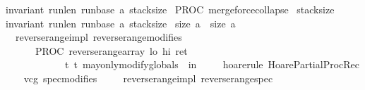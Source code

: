 \begin{isabellebody}
{\isacharparenleft}invariant\ {\isasymacute}run{\isacharunderscore}len\ {\isasymacute}run{\isacharunderscore}base\ {\isasymacute}a\ {\isasymacute}stack{\isacharunderscore}size{\isacharparenright}\ {\isasymrbrace}\isanewline
PROC\ merge{\isacharunderscore}force{\isacharunderscore}collapse{\isacharparenleft}{\isacharparenright}\isanewline
{\isasymlbrace}\ {\isacharparenleft}{\isasymacute}stack{\isacharunderscore}size\ {\isacharequal}\ {}{\isacharparenright}\ {\isasymand}\isanewline
{\isacharparenleft}invariant\ {\isasymacute}run{\isacharunderscore}len\ {\isasymacute}run{\isacharunderscore}base\ {\isasymacute}a\ {\isasymacute}stack{\isacharunderscore}size{\isacharparenright}\ {\isasymand}\isanewline
{\isacharparenleft}size\ {\isasymacute}a\ {\isacharequal}\ size\ \isactrlbsup {\isasymsigma}\isactrlesup a{\isacharparenright}\ {\isasymrbrace}{\isachardoublequoteclose}\isanewline
%
\isadelimproof
\ \ %
\endisadelimproof
%
\isatagproof
{}\isamarkupfalse%
%
\endisatagproof
{\isafoldproof}%
%
\isadelimproof
\isanewline
%
\endisadelimproof
\isanewline
\isanewline
{}\isamarkupfalse%
\ {\isacharparenleft}\ reverse{\isacharunderscore}range{\isacharunderscore}impl{\isacharparenright}\ reverse{\isacharunderscore}range{\isacharunderscore}modifies{\isacharcolon}\isanewline
\ \ \isanewline
\ \ {\isachardoublequoteopen}{\isasymforall}\ {\isasymsigma}{\isachardot}\ {\isasymGamma}{\isasymturnstile}\ {\isacharbraceleft}{\isasymsigma}{\isacharbraceright}\ PROC\ reverse{\isacharunderscore}range{\isacharparenleft}{\isasymacute}array{\isacharcomma}\ {\isasymacute}lo{\isacharcomma}\ {\isasymacute}hi{\isacharcomma}\ {\isasymacute}ret{\isacharparenright}\isanewline
\ \ \ \ \ \ \ \ \ \ \ \ {\isacharbraceleft}t{\isachardot}\ t\ may{\isacharunderscore}only{\isacharunderscore}modify{\isacharunderscore}globals\ {\isasymsigma}\ in\ {\isacharbrackleft}{\isacharbrackright}{\isacharbraceright}{\isachardoublequoteclose}\isanewline
%
\isadelimproof
\ \ %
\endisadelimproof
%
\isatagproof
{}\isamarkupfalse%
\ {\isacharparenleft}hoare{\isacharunderscore}rule\ HoarePartial{\isachardot}ProcRec{}{\isacharparenright}\isanewline
\ \ \isamarkupfalse%
\ {\isacharparenleft}vcg\ spec{\isacharequal}modifies{\isacharparenright}\isanewline
\ \ \isamarkupfalse%
%
\endisatagproof
{\isafoldproof}%
%
\isadelimproof
\isanewline
%
\endisadelimproof
\isanewline
{}\isamarkupfalse%
\ {\isacharparenleft}\ reverse{\isacharunderscore}range{\isacharunderscore}impl{\isacharparenright}\ reverse{\isacharunderscore}range{\isacharunderscore}spec{\isacharcolon}\isanewline

\end{isabellebody}

